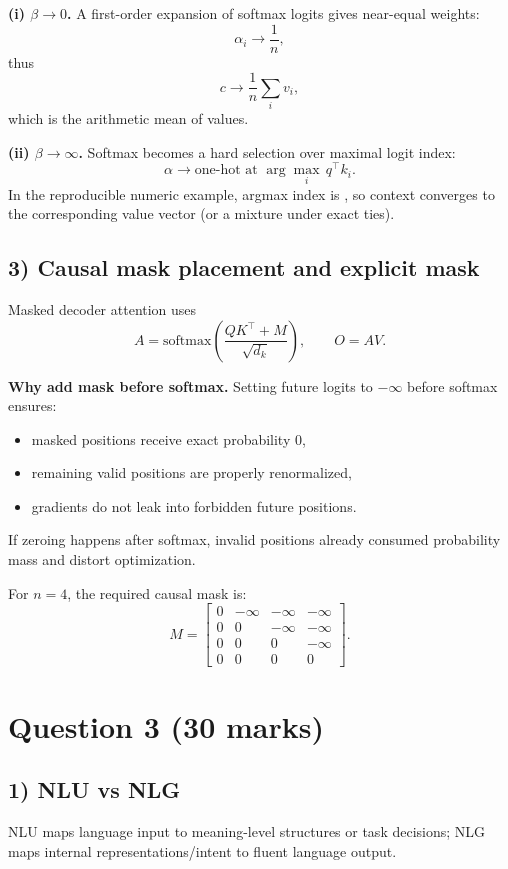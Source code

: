 \documentclass[12pt]{article}
\begin{document}
\textbf{(i) $\beta \to 0$.}
A first-order expansion of softmax logits gives near-equal weights:
\[
\alpha_i \to \frac{1}{n},
\]
thus
\[
c \to \frac{1}{n}\sum_i v_i,
\]
which is the arithmetic mean of values.

\textbf{(ii) $\beta \to \infty$.}
Softmax becomes a hard selection over maximal logit index:
\[
\alpha \to \text{one-hot at } \arg\max_i\, q^\top k_i.
\]
In the reproducible numeric example, argmax index is \QTwoArgmaxIndex, so context converges to the corresponding value vector (or a mixture under exact ties).

\subsection*{3) Causal mask placement and explicit mask}
Masked decoder attention uses
\[
A = \mathrm{softmax}\left(\frac{QK^\top + M}{\sqrt{d_k}}\right),\qquad O = AV.
\]

\textbf{Why add mask before softmax.}
Setting future logits to $-\infty$ before softmax ensures:
\begin{itemize}[leftmargin=1.2em]
    \item masked positions receive exact probability 0,
    \item remaining valid positions are properly renormalized,
    \item gradients do not leak into forbidden future positions.
\end{itemize}
If zeroing happens after softmax, invalid positions already consumed probability mass and distort optimization.

For $n=4$, the required causal mask is:
\[
M =
\begin{bmatrix}
0 & -\infty & -\infty & -\infty \\
0 & 0 & -\infty & -\infty \\
0 & 0 & 0 & -\infty \\
0 & 0 & 0 & 0
\end{bmatrix}.
\]

\section*{Question 3 (30 marks)}

\subsection*{1) NLU vs NLG}
NLU maps language input to meaning-level structures or task decisions; NLG maps internal representations/intent to fluent language output.
\end{document}

